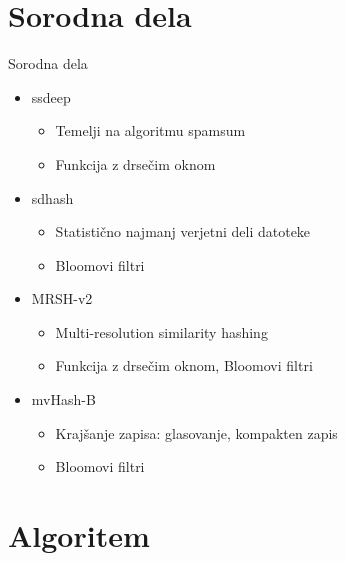 \documentclass[xcolor=dvipsnames,compress]{beamer}
\begin{document}
\section{Sorodna dela}
\label{sec:sorodna}

\begin{frame}{Sorodna dela}
\begin{itemize}
	\item ssdeep
	\begin{itemize}
		\item Temelji na algoritmu spamsum
		\item Funkcija z drsečim oknom
	\end{itemize}
	\item sdhash
	\begin{itemize}
		\item Statistično najmanj verjetni deli datoteke
		\item Bloomovi filtri
	\end{itemize}
	\item MRSH-v2
	\begin{itemize}
		\item Multi-resolution similarity hashing
		\item Funkcija z drsečim oknom, Bloomovi filtri
	\end{itemize}
	\item mvHash-B
	\begin{itemize}
		\item Krajšanje zapisa: glasovanje, kompakten zapis
		\item Bloomovi filtri
	\end{itemize}
\end{itemize}
\end{frame}
%

\section{Algoritem}
\end{document}

